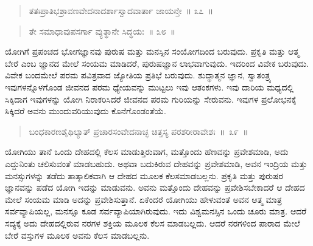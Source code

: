\vspace{-0.3cm}

\begin{verse}
ತತಃಪ್ರಾತಿಭಶ್ರಾವಣವೇದನಾದರ್ಶಾಸ್ವಾದವಾರ್ತಾ ಜಾಯನ್ತೇ~॥ ೩೭~॥
\end{verse}

\vspace{-0.3cm}


\vspace{-0.3cm}

\begin{verse}
ತೇ ಸಮಾಧಾವುಪಸರ್ಗಾ ವ್ಯುತ್ಥಾನೇ ಸಿದ್ಧಯಃ~॥ ೩೮~॥
\end{verse}

\vspace{-0.3cm}


ಯೋಗಿಗೆ ಪ್ರಪಂಚದ ಭೋಗಜ್ಞಾನವು ಪುರುಷ ಮತ್ತು ಮನಸ್ಸಿನ ಸಂಯೋಗದಿಂದ ಬರುವುದು. ಪ್ರಕೃತಿ ಮತ್ತು ಆತ್ಮ ಬೇರೆ ಎಂಬ ಜ್ಞಾನದ ಮೇಲೆ ಸಂಯಮ ಮಾಡಿದರೆ, ಪುರುಷಜ್ಞಾನ ಲಾಭವಾಗುವುದು. ಇದರಿಂದ ವಿವೇಕ ಬರುವುದು. ವಿವೇಕ ಬಂದಮೇಲೆ ಪರಮ ಪವಿತ್ರವಾದ ಜ್ಯೋತಿಯ ಪ್ರತಿಭೆ ಬರುವುದು. ಶುದ್ಧಾತ್ಮನ ಜ್ಞಾನ, ಸ್ವಾತಂತ್ರ್ಯ ಇವುಗಳನ್ನೊಳಗೊಂಡ ಜೀವನದ ಪರಮ ಧ್ಯೇಯವನ್ನು ಮುಟ್ಟಲು ಇವು ಆತಂಕಗಳು. ಇವು ದಾರಿಯ ಮಧ್ಯದಲ್ಲಿ ಸಿಕ್ಕಿದಾಗ ಇವುಗಳನ್ನು ಯೋಗಿ ನಿರಾಕರಿಸಿದರೆ ಜೀವನದ ಪರಮ ಗುರಿಯನ್ನು ಸೇರುವನು. ಇವುಗಳ ಪ್ರಲೋಭನಕ್ಕೆ ಸಿಕ್ಕಿದರೆ ಅವನು ಮುಂದುವರಿಯುವುದು ಕೊನೆಗೊಂಡಂತೆಯೆ. 

\vspace{-0.3cm}

\begin{verse}
ಬಂಧಕಾರಣಶೈಥಿಲ್ಯಾತ್​ ಪ್ರಚಾರಸಂವೇದನಾಚ್ಛ ಚಿತ್ತಸ್ಯ ಪರಶರೀರಾವೇಶಃ~॥~೩೯~॥
\end{verse}

\vspace{-0.3cm}


ಯೋಗಿಯು ತಾನೆ ಒಂದು ದೇಹದಲ್ಲಿ ಕೆಲಸ ಮಾಡುತ್ತಿರುವಾಗ, ಮತ್ತೊಂದು ಹೆಣವನ್ನು ಪ್ರವೇಶಮಾಡಿ, ಅದು ಎದ್ದುನಿಂತು ಚಲಿಸುವಂತೆ ಮಾಡಬಹುದು. ಅಥವಾ ಬದುಕಿರುವ ದೇಹವನ್ನು ಪ್ರವೇಶಮಾಡಿ, ಅವನ ಇಂದ್ರಿಯ ಮತ್ತು ಮನಸ್ಸುಗಳನ್ನು ತಡೆದು ತಾತ್ಕಾಲಿಕವಾಗಿ ಆ ದೇಹದ ಮೂಲಕ ಕೆಲಸಮಾಡಬಲ್ಲನು. ಪ್ರಕೃತಿ ಮತ್ತು ಪುರುಷರ ಜ್ಞಾನವನ್ನು ಪಡೆದ ಯೋಗಿ ಇದನ್ನು ಮಾಡುವನು. ಅವನು ಮತ್ತೊಂದು ದೇಹವನ್ನು ಪ್ರವೇಶಿಸಬೇಕಾದರೆ ಆ ದೇಹದ ಮೇಲೆ ಸಂಯಮ ಮಾಡಿ ಅದನ್ನು ಪ್ರವೇಶಿಸುತ್ತಾನೆ. ಏಕೆಂದರೆ ಯೋಗಿಯು ಹೇಳುವಂತೆ ಅವನ ಆತ್ಮ ಮಾತ್ರ ಸರ್ವವ್ಯಾಪಿಯಲ್ಲ, ಮನಸ್ಸೂ ಕೂಡ ಸರ್ವವ್ಯಾಪಿಯಾಗಿರುವುದು. ಇದು ವಿಶ್ವಮನಸ್ಸಿನ ಒಂದು ಚೂರು ಮಾತ್ರ. ಆದರೆ ಸದ್ಯಕ್ಕೆ ಅದು ದೇಹದಲ್ಲಿರುವ ನರಗಳ ಶಕ್ತಿಯ ಮೂಲಕ ಕೆಲಸ ಮಾಡಬಲ್ಲದು. ಆದರೆ ನರಗಳಿಂದ ಪಾರಾದ ಮೇಲೆ ಬೇರೆ ವಸ್ತುಗಳ ಮೂಲಕ ಅವನು ಕೆಲಸ ಮಾಡಬಲ್ಲನು. 


